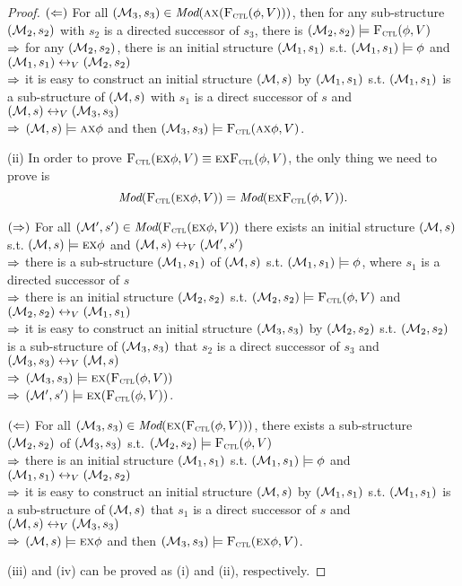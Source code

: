 \documentclass[twoside,11pt]{article}
\begin{document}
\begin{proof}
		$(\Leftarrow)$ For all $({\cal M}_3, s_3) \in \textit{Mod}(\textsc{a} \textsc{x} ({\textsc{F}_{\textsc{ctl}}}(\phi,V)))$, then for any sub-structure $({\cal M}_2, s_2)$ with $s_2$ is a directed successor of $s_3$, there is $({\cal M}_2, s_2) \models {\textsc{F}_{\textsc{ctl}}}(\phi,V)$\\
		$\Rightarrow$ for any $({\cal M}_2, s_2)$, there is an initial structure $({\cal M}_1, s_1)$ s.t. $({\cal M}_1, s_1) \models \phi$ and $({\cal M}_1, s_1) \leftrightarrow_V ({\cal M}_2, s_2)$\\
		$\Rightarrow$ it is easy to construct an initial structure $({\cal M},s)$ by $({\cal M}_1, s_1)$ s.t. $({\cal M}_1, s_1)$ is a sub-structure of $({\cal M}, s)$ with $s_1$ is a direct successor of $s$ and $({\cal M}, s)\leftrightarrow_V ({\cal M}_3, s_3)$\\
		$\Rightarrow$ $({\cal M}, s) \models \textsc{a} \textsc{x} \phi$ and then $({\cal M}_3, s_3) \models {\textsc{F}_{\textsc{ctl}}}(\textsc{a} \textsc{x} \phi, V)$.
		
		
		(ii) In order to prove ${\textsc{F}_{\textsc{ctl}}}(\textsc{e} \textsc{x} \phi, V) \equiv \textsc{e}\textsc{x}{\textsc{F}_{\textsc{ctl}}}(\phi, V)$, the only thing we need to prove is
		\[\textit{Mod}({\textsc{F}_{\textsc{ctl}}}(\textsc{e} \textsc{x} \phi, V)) = \textit{Mod}( \textsc{e}\textsc{x}{\textsc{F}_{\textsc{ctl}}}(\phi, V)).\]
		
		$(\Rightarrow)$ For all $({\cal M}', s') \in \textit{Mod}({\textsc{F}_{\textsc{ctl}}}(\textsc{e} \textsc{x} \phi, V))$ there exists an initial structure $({\cal M}, s)$ s.t. $({\cal M}, s) \models \textsc{e} \textsc{x} \phi$ and $({\cal M}, s) \leftrightarrow_V ({\cal M}',s')$\\
		$\Rightarrow$ there is a sub-structure $({\cal M}_1, s_1)$ of $({\cal M}, s)$ s.t. $({\cal M}_1, s_1) \models \phi$, where $s_1$ is a directed successor of $s$\\
		$\Rightarrow$ there is an initial structure $({\cal M}_2, s_2)$ s.t. $({\cal M}_2, s_2) \models {\textsc{F}_{\textsc{ctl}}}(\phi,V)$ and $({\cal M}_2, s_2) \leftrightarrow_V ({\cal M}_1,s_1)$\\
		$\Rightarrow$ it is easy to construct an initial structure $({\cal M}_3, s_3)$ by $({\cal M}_2, s_2)$ s.t. $({\cal M}_2, s_2)$ is a sub-structure of $({\cal M}_3, s_3)$ that $s_2$ is a direct successor of $s_3$ and $({\cal M}_3, s_3) \leftrightarrow_V ({\cal M},s)$\\
		$\Rightarrow$ $({\cal M}_3, s_3) \models \textsc{e} \textsc{x} ({\textsc{F}_{\textsc{ctl}}}(\phi,V))$\\
		$\Rightarrow$ $({\cal M}', s') \models \textsc{e} \textsc{x} ({\textsc{F}_{\textsc{ctl}}}(\phi,V))$.
		
		$(\Leftarrow)$ For all $({\cal M}_3, s_3) \in \textit{Mod}(\textsc{e} \textsc{x} ({\textsc{F}_{\textsc{ctl}}}(\phi,V)))$, there exists a sub-structure $({\cal M}_2, s_2)$ of $({\cal M}_3, s_3)$ s.t. $({\cal M}_2, s_2) \models {\textsc{F}_{\textsc{ctl}}}(\phi,V)$\\
		$\Rightarrow$ there is an initial structure $({\cal M}_1, s_1)$ s.t. $({\cal M}_1, s_1) \models \phi$ and $({\cal M}_1, s_1) \leftrightarrow_V ({\cal M}_2, s_2)$\\
		$\Rightarrow$ it is easy to construct an initial structure $({\cal M},s)$ by $({\cal M}_1, s_1)$ s.t. $({\cal M}_1, s_1)$ is a sub-structure of $({\cal M}, s)$ that $s_1$ is a direct successor of $s$ and $({\cal M}, s)\leftrightarrow_V ({\cal M}_3, s_3)$\\
		$\Rightarrow$ $({\cal M}, s) \models \textsc{e} \textsc{x} \phi$ and then $({\cal M}_3, s_3) \models {\textsc{F}_{\textsc{ctl}}}(\textsc{e} \textsc{x} \phi, V)$.
		
		
		
		(iii) and (iv) can be proved as (i) and (ii), respectively.
	\end{proof}
	
\end{document}
